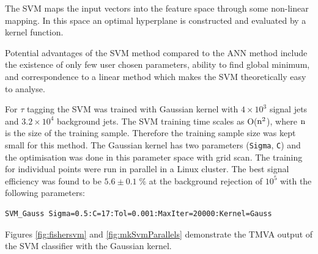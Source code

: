 \documentclass[a4paper]{jpconf}
\begin{document}
The SVM maps the input vectors into the feature space through some
non-linear mapping. 
In this space an optimal hyperplane is constructed  and evaluated by a kernel function.

Potential advantages of the SVM method compared to the ANN method
include the existence of only few user chosen parameters, ability to find global minimum, and
correspondence to a linear method which makes the SVM theoretically easy to analyse.


For $\tau$ tagging the SVM was trained with Gaussian kernel 
with $4\times 10^3$  signal jets and  $3.2\times 10^4$ background jets.
The SVM training time scales as
O(${\rm n}^2$), where ${\rm n}$ is the size of the training sample. 
Therefore the training sample size was kept small for this method. 
The Gaussian kernel has two parameters (\texttt{Sigma}, \texttt{C}) and the optimisation was done in
this parameter space with grid scan. 
The training for individual points were run in parallel in a Linux cluster. 
The best signal efficiency was found to be $5.6\pm 0.1\;\%$ 
at the background rejection of $10^5$ with the following parameters:
\begin{verbatim}
SVM_Gauss Sigma=0.5:C=17:Tol=0.001:MaxIter=20000:Kernel=Gauss
\end{verbatim}
Figures \ref{fig:fishersvm} and \ref{fig:mkSvmParallels} demonstrate the TMVA output of the SVM
classifier with the Gaussian kernel.




%
\end{document}
